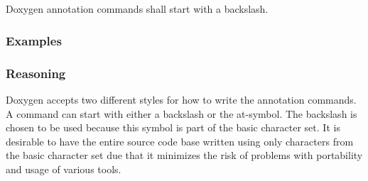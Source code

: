 \subsection*{\doxygenRule{}}

Doxygen annotation commands shall start with a backslash.

\subsubsection*{Examples}

\noindent
\begin{minipage}[t]{0.47\textwidth}
    
\end{minipage}\hfill
\begin{minipage}[t]{0.47\textwidth}
    
\end{minipage}


\subsubsection*{Reasoning}

Doxygen accepts two different styles for how to write the annotation commands. A command can start with either a backslash or the at-symbol.
The backslash is chosen to be used because this symbol is part of the basic character set. It is desirable to have the entire source code base written using only characters from the basic character set due that it minimizes the risk of problems with portability and usage of various tools.
